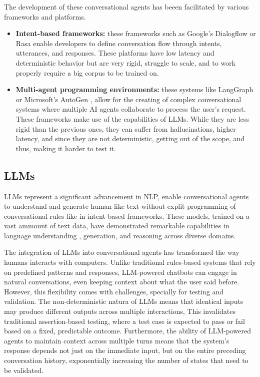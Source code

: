 The development of these conversational agents
has beeen facilitated by various frameworks and platforms.
\begin{itemize}
  \item \textbf{Intent-based frameworks:}
    these frameworks such as Google's Dialogflow \autocite{Dialogflow} or Rasa \autocite{Rasa2020}
    enable developers to define conversation flow through intents, utterances, and responses.
    These platforms have low latency and deterministic behavior
    but are very rigid, struggle to scale,
    and to work properly require a big corpus to be trained on.

  \item \textbf{Multi-agent programming environments:}
    these systems like LangGraph \autocite{LangGraph} or Microsoft's AutoGen \autocite{AutoGen},
    allow for the creating of complex conversational systems
    where multiple \ac{AI} agents collaborate to process the user's request.
    These frameworks make use of the capabilities of \acp{LLM}.
    While they are less rigid than the previous ones,
    they can suffer from hallucinations, 
    higher latency, and since they are not deterministic,
    getting out of the scope, and thus, making it harder to test it.
\end{itemize}

\subsection{\aclp{LLM}}

\aclp{LLM} represent a significant advancement in \acl{NLP},
enable conversational agents to understand and generate human-like text
without explit programming of conversational rules like in intent-based frameworks.
These models, trained on a vast ammount of text data,
have demonstrated remarkable capabilities in
language understanding \autocite{liEnhancingNaturalLanguage2024}, generation, and reasoning across diverse domains.

The integration of \acp{LLM} into conversational agents
has transformed the way humans interacts with computers.
Unlike traditional rules-based systems that rely on predefined patterns and responses,
\ac{LLM}-powered chatbots can engage in natural conversations,
even keeping context about what the user said before.
However, this flexibility comes with challenges,
specially for testing and validation.
The non-deterministic natura of \acp{LLM} means that
identical inputs may produce different outputs across multiple interactions,
This invalidates traditional assertion-based testing,
where a test case is expected to pass or fail based on a fixed, predictable outcome.
Furthermore, the ability of \ac{LLM}-powered agents
to maintain context across multiple turns
means that the system's response depends not just on the immediate input,
but on the entire preceding conversation history,
exponentially increasing the number of states that need to be validated.

